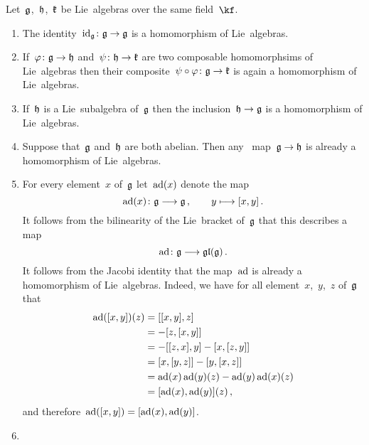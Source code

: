 \begin{examples}
  \label{homomorphisms of lie algebras}
  Let~$\mathfrak{g}$,~$\mathfrak{h}$,~$\mathfrak{k}$ be Lie~algebras over the same field~$\kf$.
  \begin{enumerate}
    \item
      \label{identity is a homomorphism of lie algebras}
      The identity~$\id_{\glie} \colon \glie \to \glie$ is a homomorphism of Lie~algebras.
    \item
      \label{composite of homomorphisms of lie algebras}
      If~$\varphi \colon \glie \to \hlie$ and~$\psi \colon \hlie \to \klie$ are two composable homomorphsims of Lie~algebras then their composite~$\psi \circ \varphi \colon \glie \to \klie$ is again a homomorphism of Lie~algebras.
    \item
      If~$\mathfrak{h}$ is a Lie~subalgebra of~$\mathfrak{g}$ then the inclusion~$\hlie \to \glie$ is a homomorphism of Lie~algebras.
    \item
      Suppose that~$\mathfrak{g}$ and~$\mathfrak{h}$ are both abelian.
      Then any~\linear{$\kf$} map~$\glie \to \hlie$ is already a homomorphism of Lie~algebras.
    \item
      For every element~$x$ of~$\mathfrak{g}$ let~$\operatorname{ad}(x)$ denote the map
      \[
        \ad(x)
        \colon
        \glie
        \to
        \glie \,,
        \qquad
        y
        \mapsto
        [x,y] \,.
        \index{adjoint representation}
      \]
      It follows from the bilinearity of the Lie~bracket of~$\mathfrak{g}$ that this describes a~\linear{$\kf$} map
      \[
        \ad
        \colon
        \glie
        \to
        \gllie(\glie) \,.
      \]
      It follows from the Jacobi identity that the map~$\operatorname{ad}$ is already a homomorphism of Lie~algebras.
      Indeed, we have for all element~$x$,~$y$,~$z$ of~$\mathfrak{g}$ that
      \begin{align*}
          \operatorname{ad}([x,y])(z)
          &=
          [[x,y], z]
          \\
          &=
          - [z, [x,y]]
          \\
          &=
          - [[z,x], y] - [x, [z,y]]
          \\
          &=
          [x, [y,z]] - [y, [x,z]]
          \\
          &=
          \operatorname{ad}(x)\operatorname{ad}(y)(z) - \operatorname{ad}(y)\operatorname{ad}(x)(z)
          \\
          &=
          [\operatorname{ad}(x), \operatorname{ad}(y)](z) \,,
      \end{align*}
      and therefore~$\operatorname{ad}([x,y]) = [ \operatorname{ad}(x), \operatorname{ad}(y) ]$.
    \item

\end{enumerate}
\end{examples}
